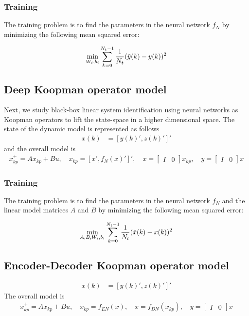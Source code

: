 \documentclass[10pt]{article}
\begin{document}
\subsubsection{Training}
The training problem is to find the parameters in the neural network
$f_N$ by minimizing the following mean squared error:

\begin{align*}
  \underset{W_i, b_i}{\textnormal{min}} \sum_{k=0}^{N_t-1} 
  \dfrac{1}{N_t}(\hat{y}(k) - y(k))^2
\end{align*}

\subsection{Deep Koopman operator model}

Next, we study black-box linear system identification using neural networks as Koopman operators to lift the state-space in a higher dimensional space. The
state of the dynamic model is represented as follows
\begin{align*}
  x(k) &= [y(k)', z(k)']'
\end{align*}
and the overall model is
\begin{align*}
  x_{kp}^+ = Ax_{kp} + Bu, \quad x_{kp} = [x', f_N(x)']', \quad x = \begin{bmatrix}
    I & 0
  \end{bmatrix}x_{kp}, \quad y = \begin{bmatrix}
    I & 0
  \end{bmatrix}x
\end{align*}

\subsubsection{Training}
The training problem is to find the parameters in the neural network
$f_N$ and the linear model matrices $A$ and $B$ by minimizing the following mean squared error:

\begin{align*}
  \underset{A, B, W_i, b_i}{\textnormal{min}} \sum_{k=0}^{N_t-1} 
  \dfrac{1}{N_t}(\hat{x}(k) - x(k))^2
\end{align*}

\subsection{Encoder-Decoder Koopman operator model}

\begin{align*}
  x(k) &= [y(k)', z(k)']'
\end{align*}
The overall model is
\begin{align*}
  x_{kp}^+ = Ax_{kp} + Bu, \quad x_{kp} = f_{EN}(x), \quad x = f_{DN}(x_{kp}), \quad y = \begin{bmatrix}
    I & 0
  \end{bmatrix}x
\end{align*}
\end{document}
